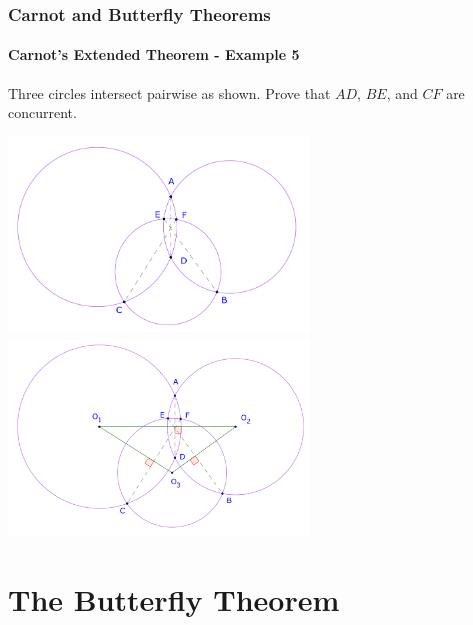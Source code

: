 \documentclass[8pt,xcolor=table,dvipsnames]{beamer}
\begin{document}
\begin{frame}[t]
    \frametitle{Carnot and Butterfly Theorems}
    \framesubtitle{Carnot's Extended Theorem - Example 5}
    \begin{example}
        Three circles intersect pairwise as shown.
        Prove that $AD$, $BE$, and $CF$ are concurrent.
    \end{example}
    \begin{center}
        \begin{overprint}
            \centering\includegraphics[width=8cm]{./svg/pdf/24-25-t2-p14.pdf}
            \centering\includegraphics[width=8cm]{./svg/pdf/24-25-t2-p14-2.pdf}
        \end{overprint}        
    \end{center}
\end{frame}

\section{The Butterfly Theorem}
\end{document}
